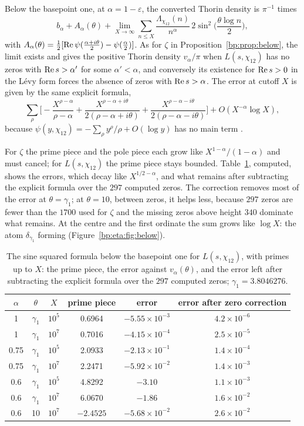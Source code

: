 \label{bp:eta:sec:below}Below the basepoint one, at $\alpha=1-\varepsilon$, the converted Thorin density is $\pi^{-1}$ times
\[
b_\alpha+A_\alpha(\theta)+\lim_{X\to\infty}\sum_{n\le X}\frac{\Lambda_{\chi_{12}}(n)}{n^\alpha}\,2\sin^2\Big(\frac{\theta\log n}2\Big),
\]
with $A_\alpha(\theta)=\frac12[\operatorname{Re}\psi(\frac{\alpha+i\theta}2)-\psi(\frac\alpha2)]$. As for $\zeta$ in Proposition~\ref{bp:prop:below}, the limit exists and gives the positive Thorin density $v_\alpha/\pi$ when $L(s,\chi_{12})$ has no zeros with $\operatorname{Re} s>\alpha'$ for some $\alpha'<\alpha$, and conversely its existence for $\operatorname{Re} s>0$ in the L\'evy form forces the absence of zeros with $\operatorname{Re} s>\alpha$. The error at cutoff $X$ is given by the same explicit formula,
\[
\sum_\rho\Big[-\frac{X^{\rho-\alpha}}{\rho-\alpha}+\frac{X^{\rho-\alpha+i\theta}}{2(\rho-\alpha+i\theta)}+\frac{X^{\rho-\alpha-i\theta}}{2(\rho-\alpha-i\theta)}\Big]+O(X^{-\alpha}\log X),
\]
because $\psi(y,\chi_{12})=-\sum_\rho y^\rho/\rho+O(\log y)$ has no main term \cite[Chapter~19]{Davenport}.

For $\zeta$ the prime piece and the pole piece each grow like $X^{1-\alpha}/(1-\alpha)$ and must cancel; for $L(s,\chi_{12})$ the prime piece stays bounded. Table~\ref{bp:eta:tab:below}, computed, shows the errors, which decay like $X^{1/2-\alpha}$, and what remains after subtracting the explicit formula over the $297$ computed zeros. The correction removes most of the error at $\theta=\gamma_1$; at $\theta=10$, between zeros, it helps less, because $297$ zeros are fewer than the $1700$ used for $\zeta$ and the missing zeros above height $340$ dominate what remains. At the centre and the first ordinate the sum grows like $\log X$: the atom $\delta_{\gamma_1}$ forming (Figure~\ref{bp:eta:fig:below}).

\begin{table}[htbp]
\centering\small
\begin{tabular}{cccccc}
\toprule
$\alpha$ & $\theta$ & $X$ & prime piece & error & error after zero correction\\
\midrule
1 & $\gamma_1$ & $10^5$ & 0.6964 & $-5.55\times10^{-3}$ & $4.2\times10^{-6}$\\
1 & $\gamma_1$ & $10^7$ & 0.7016 & $-4.15\times10^{-4}$ & $2.5\times10^{-5}$\\
0.75 & $\gamma_1$ & $10^5$ & 2.0933 & $-2.13\times10^{-1}$ & $1.4\times10^{-4}$\\
0.75 & $\gamma_1$ & $10^7$ & 2.2471 & $-5.92\times10^{-2}$ & $1.4\times10^{-3}$\\
0.6 & $\gamma_1$ & $10^5$ & 4.8292 & $-3.10$ & $1.1\times10^{-3}$\\
0.6 & $\gamma_1$ & $10^7$ & 6.0670 & $-1.86$ & $1.6\times10^{-2}$\\
0.6 & 10 & $10^7$ & $-2.4525$ & $-5.68\times10^{-2}$ & $2.6\times10^{-2}$\\
\bottomrule
\end{tabular}
\caption{The sine squared formula below the basepoint one for $L(s,\chi_{12})$, with primes up to $X$: the prime piece, the error against $v_\alpha(\theta)$, and the error left after subtracting the explicit formula over the $297$ computed zeros; $\gamma_1=3.8046276$.}
\label{bp:eta:tab:below}
\end{table}


